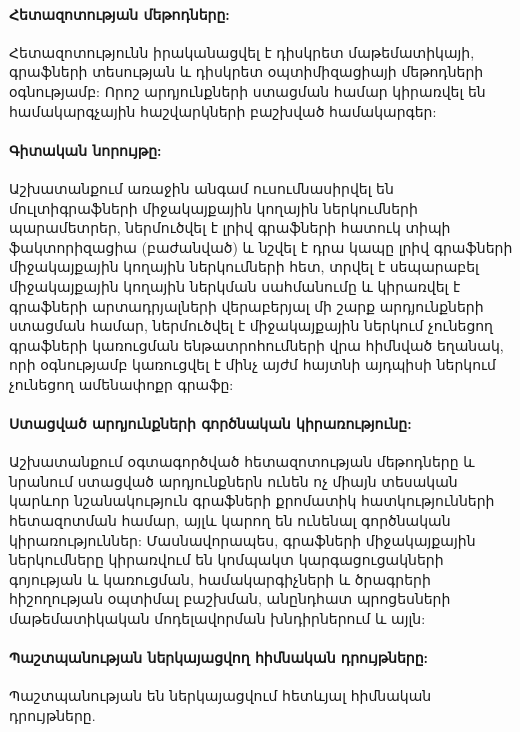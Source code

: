 \paragraph{Հետազոտության մեթոդները:}
Հետազոտությունն իրականացվել է դիսկրետ մաթեմատիկայի, գրաֆների տեսության և դիսկրետ օպտիմիզացիայի մեթոդների օգնությամբ: Որոշ արդյունքների ստացման համար կիրառվել են համակարգչային հաշվարկների բաշխված համակարգեր:


\paragraph{Գիտական նորույթը:}
Աշխատանքում առաջին անգամ ուսումնասիրվել են մուլտիգրաֆների միջակայքային կողային ներկումների պարամետրեր, ներմուծվել է լրիվ գրաֆների հատուկ տիպի ֆակտորիզացիա (բաժանված) և նշվել է դրա կապը լրիվ գրաֆների միջակայքային կողային ներկումների հետ, տրվել է սեպարաբել միջակայքային կողային ներկման սահմանումը և կիրառվել է գրաֆների արտադրյալների վերաբերյալ մի շարք արդյունքների ստացման համար, ներմուծվել է միջակայքային ներկում չունեցող գրաֆների կառուցման ենթատրոհումների վրա հիմնված եղանակ, որի օգնությամբ կառուցվել է մինչ այժմ հայտնի այդպիսի ներկում չունեցող ամենափոքր գրաֆը:


\paragraph{Ստացված արդյունքների գործնական կիրառությունը:}
Աշխատանքում օգտագործված հետազոտության մեթոդները և նրանում ստացված արդյունքներն ունեն ոչ միայն տեսական կարևոր նշանակություն գրաֆների քրոմատիկ հատկությունների հետազոտման համար, այլև կարող են ունենալ գործնական կիրառություններ: Մասնավորապես, գրաֆների միջակայքային ներկումները կիրառվում են կոմպակտ կարգացուցակների գոյության և կառուցման, համակարգիչների և ծրագրերի հիշողության օպտիմալ բաշխման, անընդհատ պրոցեսների մաթեմատիկական մոդելավորման խնդիրներում և այլն: 



\paragraph{Պաշտպանության ներկայացվող հիմնական դրույթները:}
Պաշտպանության են ներկայացվում հետևյալ հիմնական դրույթները.

